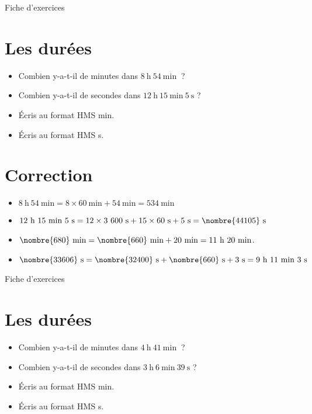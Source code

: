 \documentclass[a4paper,11pt,fleqn]{article}
\begin{document}
\newpage
\setcounter{exo}{0}
\setcounter{section}{0}
\begin{center}
	{\huge Fiche d'exercices } 	
\end{center}


\section{Les durées}
\begin{itemize}
  \item Combien y-a-t-il de minutes dans $8~\text{h}~54~\text{min}~$ ?
  \item Combien y-a-t-il de secondes dans $12~\text{h}~15~\text{min}~5~\text{s}$ ?
  \item Écris au format HMS  min.
  \item Écris au format HMS  s.
\end{itemize}

\section{Correction}
\begin{itemize}
 \item $8~\text{h}~54~\text{min}=8\times60~\text{min}+54~\text{min}=534~\text{min}$
  \item $12~\text{h}~15~\text{min}~5~\text{s}=12\times3~600~\text{s}+15\times60~\text{s}+5~\text{s}=\nombre{44105}~\text{s}$
  \item $\nombre{680}~\text{min}=\nombre{660}~\text{min}+20~\text{min}=11~\text{h}~20~\text{min}$.
  \item $\nombre{33606}~\text{s}=\nombre{32400}~\text{s}+\nombre{660}~\text{s}+3~\text{s}=9~\text{h}~11~\text{min}~3~\text{s}$ \end{itemize}


\newpage
\setcounter{exo}{0}
\setcounter{section}{0}
\begin{center}
	{\huge Fiche d'exercices } 	
\end{center}


\section{Les durées}
\begin{itemize}
  \item Combien y-a-t-il de minutes dans $4~\text{h}~41~\text{min}~$ ?
  \item Combien y-a-t-il de secondes dans $3~\text{h}~6~\text{min}~39~\text{s}$ ?
  \item Écris au format HMS  min.
  \item Écris au format HMS  s.
\end{itemize}
\end{document}
